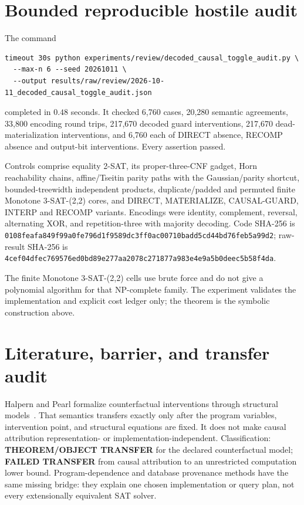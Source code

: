 \documentclass[11pt]{article}
\begin{document}
\section{Bounded reproducible hostile audit}
The command
\begin{verbatim}
timeout 30s python experiments/review/decoded_causal_toggle_audit.py \
  --max-n 6 --seed 20261011 \
  --output results/raw/review/2026-10-11_decoded_causal_toggle_audit.json
\end{verbatim}
completed in $0.48$ seconds.  It checked 6,760 cases, 20,280 semantic
agreements, 33,800 encoding round trips, 217,670 decoded guard
interventions, 217,670 dead-materialization interventions, and 6,760 each of
DIRECT absence, RECOMP absence and output-bit interventions.  Every assertion
passed.

Controls comprise equality 2-SAT, its proper-three-CNF gadget, Horn reachability
chains, affine/Tseitin parity paths with the Gaussian/parity shortcut,
bounded-treewidth independent products, duplicate/padded and permuted finite
Monotone 3-SAT-(2,2) cores, and DIRECT, MATERIALIZE, CAUSAL-GUARD, INTERP and
RECOMP variants.  Encodings were identity, complement, reversal, alternating
XOR, and repetition-three with majority decoding.  Code SHA-256 is
\nolinkurl{0108feafa849f99a0fe796d1f9589dc3ff0ac00710badd5cd44bd76feb5a99d2};
raw-result SHA-256 is
\nolinkurl{4cef04dfec769576ed0bd89e277aa2078c271877a983e4e9a5b0deec5b58f4da}.

The finite Monotone 3-SAT-(2,2) cells use brute force and do not give a
polynomial algorithm for that NP-complete family.  The experiment validates
the implementation and explicit cost ledger only; the theorem is the
symbolic construction above.

\section{Literature, barrier, and transfer audit}
Halpern and Pearl formalize counterfactual interventions through structural
models~\cite{hp}.  That semantics transfers exactly only after the program
variables, intervention point, and structural equations are fixed.  It does
not make causal attribution representation- or implementation-independent.
Classification: \textbf{THEOREM/OBJECT TRANSFER} for the declared
counterfactual model; \textbf{FAILED TRANSFER} from causal attribution to an
unrestricted computation lower bound.  Program-dependence and database
provenance methods have the same missing bridge: they explain one chosen
implementation or query plan, not every extensionally equivalent SAT solver.
\end{document}
